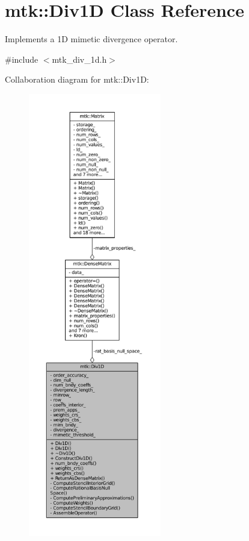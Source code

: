 \hypertarget{classmtk_1_1Div1D}{\section{mtk\-:\-:Div1\-D Class Reference}
\label{classmtk_1_1Div1D}
}


Implements a 1\-D mimetic divergence operator.  




{\ttfamily \#include $<$mtk\-\_\-div\-\_\-1d.\-h$>$}



Collaboration diagram for mtk\-:\-:Div1\-D\-:
\nopagebreak
\begin{figure}[H]
\begin{center}
\leavevmode
\includegraphics[height=550pt]{classmtk_1_1Div1D__coll__graph}
\end{center}
\end{figure}
